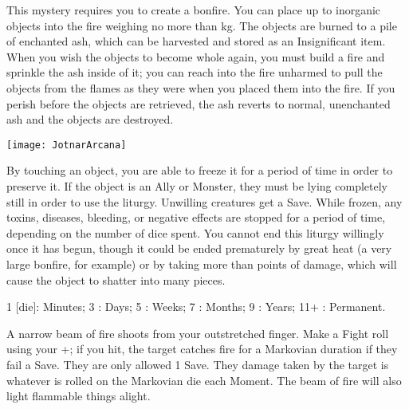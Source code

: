 {This mystery requires you to create a bonfire.  You can place up to \DICE inorganic objects into the fire weighing no more than \SUMDICE kg.  The objects are burned to a pile of enchanted ash, which can be harvested and stored as an Insignificant item.  When you wish the objects to become whole again, you must build a fire and sprinkle the ash inside of it; you can reach into the fire unharmed to pull the objects from the flames as they were when you placed them into the fire.  If you perish before the objects are retrieved, the ash reverts to normal, unenchanted ash and the objects are destroyed.


  \begin{center}
  \texttt{[image: JotnarArcana]}
  \end{center}



\MYSTERY [
  Name = Preserve,
  Link = arcana-mystery-preserve,
  Paradigm = Elements,
  Save = Y (neg.),
  Duration = varies,
  Target = Close Target(s)
]

By touching an object, you are able to freeze it for a period of time in order to preserve it.  If the object is an Ally or Monster, they must be lying completely still in order to use the liturgy.  Unwilling creatures get a Save.  While frozen, any toxins, diseases, bleeding, or negative effects are stopped for a period of time, depending on the number of dice spent.  You cannot end this liturgy willingly once it has begun, though it could be ended prematurely by great heat (a very large bonfire, for example) or by taking more than \SUMDICE points of damage, which will cause the object to shatter into many pieces.  

1 [die]: Minutes; 3 \DICE: Days; 5 \DICE: Weeks; 7 \DICE: Months; 9 \DICE: Years; 11+ \DICE: Permanent. 

\MYSTERY [
  Name = Ray of Fire,
  Link = arcana-mystery-ray-of-fire,
  Paradigm = Elements,
  Save = Y (neg.),
  Duration = Instant,
  Target = Nearby or Far-Away Target(s)
]

A narrow beam of fire shoots from your outstretched finger.  Make a Fight roll using your \FOC+\DICE; if you hit, the target catches fire for a Markovian duration if they fail a Save.  They are only allowed 1 Save.  They damage taken by the target is whatever is rolled on the Markovian die each Moment.  The beam of fire will also light flammable things alight.

\MYSTERY [
  Name = Trollblood,
  Link = arcana-mystery-trollblood,
  Paradigm = Death,
  Save = n/a,
  Duration = Combat,
  Target = Self
]

}
